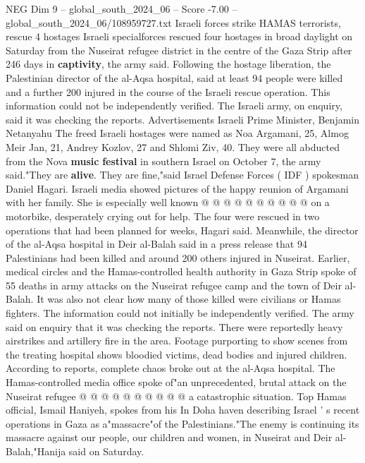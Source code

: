 \begin{textsample}{NEG Dim 9 – global\_south\_2024\_06 – Score -7.00 – global\_south\_2024\_06/108959727.txt}  \label{ex:f9_neg_351}
Israeli forces strike HAMAS terrorists, rescue 4 hostages Israeli specialforces rescued four hostages in broad daylight on Saturday from the Nuseirat refugee district in the centre of the Gaza Strip after 246 days in \textbf{captivity}, the army said.
Following the hostage liberation, the Palestinian director of the al-Aqsa hospital, said at least 94 people were killed and a further 200 injured in the course of the Israeli rescue operation.
This information could not be independently verified.
The Israeli army, on enquiry, said it was checking the reports.
Advertisements Israeli Prime Minister, Benjamin Netanyahu The freed Israeli hostages were named as Noa Argamani, 25, Almog Meir Jan, 21, Andrey Kozlov, 27 and Shlomi Ziv, 40.
They were all abducted from the Nova \textbf{music} \textbf{festival} in southern Israel on October 7, the army said."They are \textbf{alive}.
They are fine,"said Israel Defense Forces ( IDF ) spokesman Daniel Hagari.
Israeli media showed pictures of the happy reunion of Argamani with her family.
She is especially well known @ @ @ @ @ @ @ @ @ @ on a motorbike, desperately crying out for help.
The four were rescued in two operations that had been planned for weeks, Hagari said.
Meanwhile, the director of the al-Aqsa hospital in Deir al-Balah said in a press release that 94 Palestinians had been killed and around 200 others injured in Nuseirat.
Earlier, medical circles and the Hamas-controlled health authority in Gaza Strip spoke of 55 deaths in army attacks on the Nuseirat refugee camp and the town of Deir al-Balah.
It was also not clear how many of those killed were civilians or Hamas fighters.
The information could not initially be independently verified.
The army said on enquiry that it was checking the reports.
There were reportedly heavy airstrikes and artillery fire in the area.
Footage purporting to show scenes from the treating hospital shows bloodied victims, dead bodies and injured children.
According to reports, complete chaos broke out at the al-Aqsa hospital.
The Hamas-controlled media office spoke of"an unprecedented, brutal attack on the Nuseirat refugee @ @ @ @ @ @ @ @ @ @ a catastrophic situation.
Top Hamas official, Ismail Haniyeh, spokes from his In Doha haven describing Israel ' s recent operations in Gaza as a"massacre"of the Palestinians."The enemy is continuing its massacre against our people, our children and women, in Nuseirat and Deir al-Balah,"Hanija said on Saturday.

\end{textsample}
